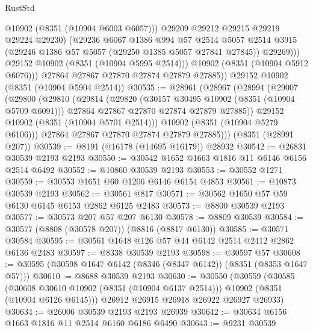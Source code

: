 \begin{lexlean}{RustStd}
\begin{coremodule}
                    @10902
                    (@8351 (@10904 @6003 @6057)))
                  @29209
                  @29212
                  @29215
                  @29219
                  @29224
                  @29230)
                (@29236
                  @6067
                  @1386
                  @994
                  @57
                  @2514
                  @5057
                  @2514
                  @3915
                  (@29246 @1386 @57 @5057 (@29250 @1385 @5057 @27841 @27845))
                  @29269)))
            @29152
            @10902
            (@8351 (@10904 @5995 @2514)))
          @10902
          (@8351 (@10904 @5912 @6076)))
        @27864
        @27867
        @27870
        @27874
        @27879
        @27885))
    @29152
    @10902
    (@8351 (@10904 @5904 @2514))
@30535 := @28961
    (@28967
      (@28994
        (@29007
          (@29800
            (@29810
              (@29814
                (@29820
                  (@30157 @30495 @10902 (@8351 (@10904 @5709 @6091)))
                  @27864
                  @27867
                  @27870
                  @27874
                  @27879
                  @27885))
              @29152
              @10902
              (@8351 (@10904 @5701 @2514)))
            @10902
            (@8351 (@10904 @5279 @6106)))
          @27864
          @27867
          @27870
          @27874
          @27879
          @27885)))
    (@8351 (@28991 @207))
@30539 := @8191 (@16178 (@14695 @16179)) @28932
@30542 := @26831 @30539 @2193 @2193
@30550 := @30542 @1652 @1663 @1816 @11 @6146 @6156 @2514 @6492
@30552 := @10860 @30539 @2193
@30553 := @30552 @1271
@30559 := @30553 @1651 @60 @1206 @6146 @6154 @4853
@30561 := @10873 @30539 @2193
@30562 := @30561 @817
@30571 := @30562 @1650 @57 @59 @6130 @6145 @6153 @2862 @6125 @2483
@30573 := @8800 @30539 @2193
@30577 := @30573 @207 @57 @207 @6130
@30578 := @8809 @30539
@30584 := @30577 (@8808 (@30578 @207)) (@8816 (@8817 @6130))
@30585 := @30571 @30584
@30595 := @30561 @1648 @126 @57 @44 @6142 @2514 @2412 @2862 @6136 @2483
@30597 := @8338 @30539 @2193
@30598 := @30597 @57
@30608 := @30595 (@30598 @1647 @6142 (@8346 (@8347 @6142)) (@8351 (@8353 @1647 @57)))
@30610 := @8688 @30539 @2193
@30630 := @30550
    (@30559
      (@30585
        (@30608 @30610 @10902 (@8351 (@10904 @6137 @2514)))
        @10902
        (@8351 (@10904 @6126 @6145)))
      @26912
      @26915
      @26918
      @26922
      @26927
      @26933)
@30634 := @26006 @30539 @2193 @2193 @26939
@30642 := @30634 @6156 @1663 @1816 @11 @2514 @6160 @6186 @6490
@30643 := @9231 @30539

\end{coremodule}
\end{lexlean}
